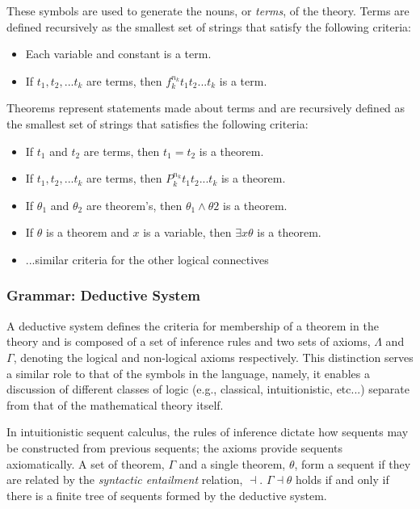 \documentclass{article}
\begin{document}
These symbols are used to generate the nouns, or \textit{terms}, of the theory. Terms are defined recursively as the smallest set of strings that satisfy the following criteria:
\begin{itemize}
\item Each variable and constant is a term.
\item If $t_1, t_2, ... t_k$ are terms, then $f^{n_k}_k t_1 t_2 ... t_k$ is a term.
\end{itemize}

Theorems represent statements made about terms and are recursively defined as the smallest set of strings that satisfies the following criteria:
\begin{itemize}
\item If $t_1$ and $t_2$ are terms, then $t_1 = t_2$ is a theorem.
\item If $t_1, t_2, ... t_k$ are terms, then $P^{n_k}_k t_1 t_2 ... t_k$ is a theorem.
\item If $\theta_1$ and $\theta_2$ are theorem's, then $\theta_1 \wedge \theta2$ is a theorem.
\item If $\theta$ is a theorem and $x$ is a variable, then $\exists x \theta$ is a theorem.
\item ...similar criteria for the other logical connectives
\end{itemize}

\subsubsection{Grammar: Deductive System}
A deductive system defines the criteria for membership of a theorem in the theory and is composed of a set of inference rules and two sets of axioms, $\Lambda$ and $\Gamma$, denoting the logical and non-logical axioms respectively. This distinction serves a similar role to that of the symbols in the language, namely, it enables a discussion of different classes of logic (e.g., classical, intuitionistic, etc...) separate from that of the mathematical theory itself. 

In intuitionistic sequent calculus, the rules of inference dictate how sequents may be constructed from previous sequents; the axioms provide sequents axiomatically. A set of theorem, $\Gamma$ and a single theorem, $\theta$, form a sequent if they are related by the \textit{syntactic entailment} relation, $\dashv$. $\Gamma \dashv \theta$ holds if and only if there is a finite tree of sequents formed by the deductive system.
\end{document}
